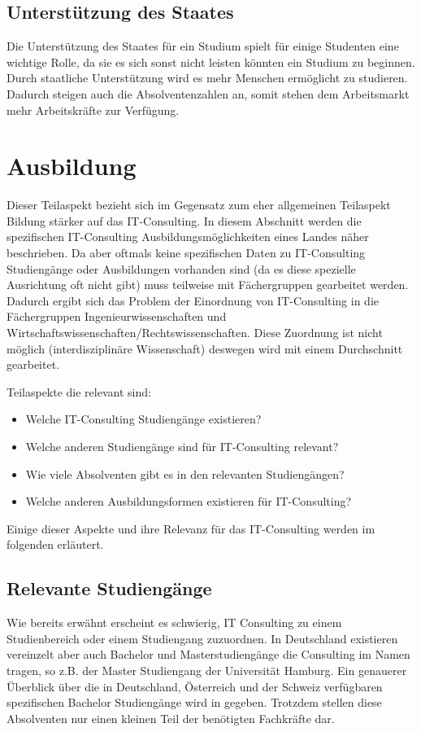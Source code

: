 \subsection{Unterstützung des Staates} 
Die Unterstützung des Staates für ein Studium spielt für einige Studenten eine wichtige Rolle, da sie es sich sonst nicht leisten könnten ein Studium zu beginnen. Durch staatliche Unterstützung wird es mehr Menschen ermöglicht zu studieren. Dadurch steigen auch die Absolventenzahlen an, somit stehen dem Arbeitsmarkt mehr Arbeitskräfte zur Verfügung.


 \section{Ausbildung}
Dieser Teilaspekt bezieht sich im Gegensatz zum eher allgemeinen Teilaspekt Bildung stärker auf das IT-Consulting. In diesem Abschnitt werden die spezifischen IT-Consulting Ausbildungsmöglichkeiten eines Landes näher beschrieben.
Da aber oftmals keine spezifischen Daten zu IT-Consulting Studiengänge oder Ausbildungen vorhanden sind (da es diese spezielle Ausrichtung oft nicht gibt) muss teilweise mit Fächergruppen gearbeitet werden.
Dadurch ergibt sich das Problem der Einordnung von IT-Consulting in die Fächergruppen Ingenieurwissenschaften und Wirtschaftswissenschaften/Rechtswissenschaften. Diese Zuordnung ist nicht möglich (interdisziplinäre Wissenschaft) deswegen wird mit einem Durchschnitt gearbeitet.

Teilaspekte die relevant sind:
\begin{itemize} 
\item Welche IT-Consulting Studiengänge existieren?
\item Welche anderen Studiengänge sind für IT-Consulting relevant?
\item Wie viele Absolventen gibt es in den relevanten Studiengängen?
\item Welche anderen Ausbildungsformen existieren für IT-Consulting?
\end{itemize}

Einige dieser Aspekte und ihre Relevanz für das IT-Consulting werden im folgenden erläutert.

\subsection{Relevante Studiengänge}
Wie bereits erwähnt erscheint es schwierig, IT Consulting zu einem Studienbereich oder einem Studiengang zuzuordnen. 
In Deutschland existieren vereinzelt aber auch Bachelor und Masterstudiengänge die Consulting im Namen tragen, so z.B. der Master Studiengang der Universität Hamburg. Ein genauerer Überblick über die in Deutschland, Österreich und der Schweiz verfügbaren spezifischen Bachelor Studiengänge wird in \cite{NissenKlaukDeelmannMohe201209} gegeben. Trotzdem stellen diese Absolventen nur einen kleinen Teil der benötigten Fachkräfte dar. 

